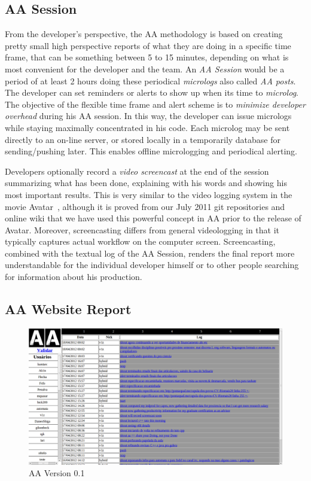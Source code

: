 \documentclass[letterpaper]{article}
\begin{document}
\subsection{AA Session}

From the developer's perspective, the AA methodology is based on
creating pretty small high perspective reports of what they are doing
in a specific time frame, that can be something between 5 to 15
minutes, depending on what is most convenient for the developer and the team. An
\emph{AA Session} would be a period of at least 2 hours doing these periodical
\emph{micrologs} also called \emph{AA posts}. The developer can set reminders or alerts to show up when its time to
\emph{microlog}. The objective of the flexible time frame and
alert scheme is to \emph{minimize developer overhead} during his AA session. In
this way, the developer can issue micrologs while staying maximally concentrated in his
code. Each microlog may be sent directly to an on-line server, or stored
locally in a temporarily database for sending/pushing later. This enables
offline micrologging and periodical alerting.

Developers optionally record a \emph{video screencast} at the end of the
session summarizing what has been done, explaining with his words and
showing his most important results. This is very similar to the video logging system
in the movie Avatar~\cite{Avatar}, although it is proved from our July 2011 git repositories and online
wiki that we have used this powerful concept in AA prior to the release of
Avatar. Moreover, screencasting differs from general videologging in that it
typically captures actual workflow on
the computer screen. Screencasting, combined with the textual log of the AA
Session, renders the final report more understandable for the individual developer himself
or to other people searching for information about his production.

\subsection{AA Website Report}

\begin{figure}
\begin{center}
   \includegraphics[width=0.95\linewidth]{figs/aa-0_1.png}
\end{center}
   \caption{AA Version 0.1}
\label{fig:aaserver}
\end{figure}
\end{document}
